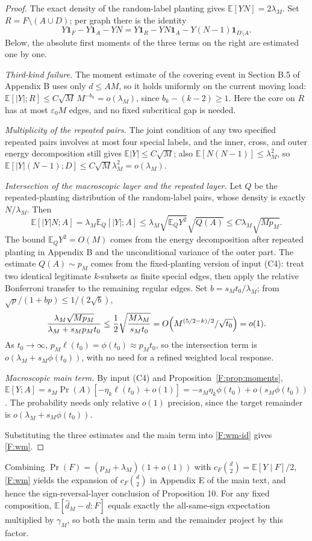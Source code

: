 \documentclass[a4paper,11pt]{article}
\numberwithin{equation}{section}
\newcommand{\E}{\mathbb E}
\begin{document}
\begin{proof}
The exact density of the random-label planting gives $\E[YN]=2\lambda_M$. Set $R=F\setminus(A\cup D)$; per
graph there is the identity
\begin{equation}
Y\mathbf1_F-Y\mathbf1_A-YN=Y\mathbf1_R-YN\mathbf1_A-Y(N-1)\mathbf1_{D\setminus A}.\label{F:wm-id}
\end{equation}
Below, the absolute first moments of the three terms on the right are estimated one by one.

\emph{Third-kind failure.} The moment estimate of the covering event in Section B.5 of Appendix B uses only
$d\le AM$, so it holds uniformly on the current moving load: $\E[|Y|;R]\le C\sqrt M\,M^{-b_k}=o(\lambda_M)$,
since $b_k-(k-2)\ge1$. Here the core on $R$ has at most $\varepsilon_0M$ edges, and no fixed subcritical gap
is needed.

\emph{Multiplicity of the repeated pairs.} The joint condition of any two specified repeated pairs involves at
most four special labels, and the inner, cross, and outer energy decomposition still gives
$\E|Y|\le C\sqrt M$; also $\E[N(N-1)]\le\lambda_M^2$, so
$\E[|Y|(N-1);D]\le C\sqrt M\lambda_M^2=o(\lambda_M)$.

\emph{Intersection of the macroscopic layer and the repeated layer.} Let $Q$ be the repeated-planting
distribution of the random-label pairs, whose density is exactly $N/\lambda_M$. Then
\[
\E[|Y|N;A]=\lambda_M\E_Q[|Y|;A]\le\lambda_M\sqrt{\E_QY^2}\sqrt{Q(A)}\le C\lambda_M\sqrt{Mp_M}.
\]
The bound $\E_QY^2=O(M)$ comes from the energy decomposition after repeated planting in Appendix B and the
unconditional variance of the outer part. The estimate $Q(A)\sim p_M$ comes from the fixed-planting version of
input (C4): treat two identical legitimate $k$-subsets as finite special edges, then apply the relative
Bonferroni transfer to the remaining regular edges. Set $b=s_Mt_0/\lambda_M$; from
$\sqrt{p}/(1+bp)\le1/(2\sqrt b)$,
\[
\frac{\lambda_M\sqrt{Mp_M}}{\lambda_M+s_Mp_Mt_0}\le\frac12\sqrt{\frac{M\lambda_M}{s_Mt_0}}=O\Bigl(M^{(5/2-k)/2}/\sqrt{t_0}\Bigr)=o(1).
\]
As $t_0\to\infty$, $p_M\ell(t_0)=\phi(t_0)\approx p_Mt_0$, so the intersection term is
$o(\lambda_M+s_M\phi(t_0))$, with no need for a refined weighted local response.

\emph{Macroscopic main term.} By input (C4) and Proposition~\ref{F:prop:moments},
$\E[Y;A]=s_M\Pr(A)[-\eta_k\ell(t_0)+o(1)]=-s_M\eta_k\phi(t_0)+o(s_M\phi(t_0))$. The probability needs only
relative $o(1)$ precision, since the target remainder is $o(\lambda_M+s_M\phi(t_0))$.

Substituting the three estimates and the main term into \eqref{F:wm-id} gives \eqref{F:wm}.
\end{proof}

Combining $\Pr(F)=(p_M+\lambda_M)(1+o(1))$ with $c_F\binom d2=\E[Y\mid F]/2$, \eqref{F:wm} yields the
expansion of $c_F\binom d2$ in Appendix E of the main text, and hence the sign-reversal-layer conclusion of
Proposition 10. For any fixed composition, $\E[\widehat d_M-d;F]$ equals exactly the all-same-sign expectation
multiplied by $\gamma_M$, so both the main term and the remainder project by this factor.
\end{document}
